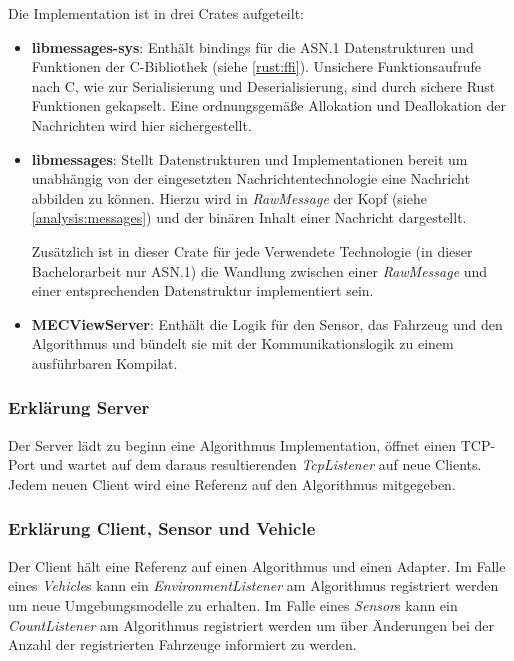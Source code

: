Die Implementation ist in drei Crates aufgeteilt:
\begin{itemize}
	\item \textbf{libmessages-sys}: Enthält bindings für die ASN.1 Datenstrukturen und Funktionen der C-Bibliothek (siehe \autoref{rust:ffi}).
	Unsichere Funktionsaufrufe nach C, wie zur Serialisierung und Deserialisierung, sind durch sichere Rust Funktionen gekapselt.
	Eine ordnungsgemäße Allokation und Deallokation der Nachrichten wird hier sichergestellt.
	
	\item \textbf{libmessages}: Stellt Datenstrukturen und Implementationen bereit um unabhängig von der eingesetzten Nachrichtentechnologie eine Nachricht abbilden zu können.
	Hierzu wird in \textit{RawMessage} der Kopf (siehe \autoref{analysis:messages}) und der binären Inhalt einer Nachricht dargestellt.
	
	Zusätzlich ist in dieser Crate für jede Verwendete Technologie (in dieser Bachelorarbeit nur ASN.1) die Wandlung zwischen einer \textit{RawMessage} und einer entsprechenden Datenstruktur implementiert sein.
	
	\item \textbf{MECViewServer}: Enthält die Logik für den Sensor, das Fahrzeug und den Algorithmus und bündelt sie mit der Kommunikationslogik zu einem ausführbaren Kompilat.
\end{itemize}

\subsubsection{Erklärung Server}

Der Server lädt zu beginn eine Algorithmus Implementation, öffnet einen TCP-Port und wartet auf dem daraus resultierenden \textit{TcpListener} auf neue Clients.
Jedem neuen Client wird eine Referenz auf den Algorithmus mitgegeben.

\subsubsection{Erklärung Client, Sensor und Vehicle}

Der Client hält eine Referenz auf einen Algorithmus und einen Adapter.
Im Falle eines \textit{Vehicle}s kann ein \textit{EnvironmentListener} am Algorithmus registriert werden um neue Umgebungsmodelle zu erhalten.
Im Falle eines \textit{Sensor}s kann ein \textit{CountListener} am Algorithmus registriert werden um über Änderungen bei der Anzahl der registrierten Fahrzeuge informiert zu werden.

